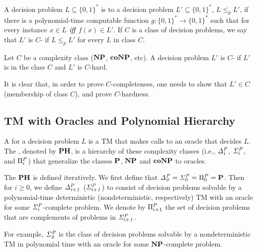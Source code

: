 \begin{definition}
	A decision problem $L \subseteq \{0,1\}^*$  is  to
	a decision problem $L' \subseteq \{0,1\}^*$, $L \leq_p L'$, if there is a
	polynomial-time computable function $g : \{0,1\}^* \rightarrow \{0,1\}^*$
	such that for every instance $x \in L$ $\textit{iff}$ $f(x) \in L'$.
	If $C$ is a class of decision problems, we say that 
	$L'$ is $C$- if $L \leq_p L'$ for 
	every $L$ in class $C$.
\end{definition}


\begin{definition}
	Let $C$ be a complexity class ($\textbf{NP}$, $\textbf{coNP}$, etc).
	A decision problem $L'$ is $C$- if $L'$ is in the class 
	$C$ and $L'$ is $C$-hard.
\end{definition}
It is clear that, in order to prove $C$-completeness, one needs to show
that $L' \in C$ (membership of class $C$), and prove $C$-hardness.



\subsection{TM with Oracles and Polynomial Hierarchy}
A  for a decision problem $L$ is a TM that makes calls 
to an oracle that decides $L$.
The , denoted by $\textbf{PH}$, is a hierarchy of these
complexity classes (i.e., $\mathit{\Delta^P_{i}}$, $\mathit{\Sigma^P_{i}}$, and $\Pi^P_{i}$)
that generalize the classes $\textbf{P}$, $\textbf{NP}$ and $\textbf{coNP}$ to oracles.

\begin{definition}
	The $\textbf{PH}$ is defined iteratively.
	We first define that $\mathit{\Delta^P_{0}} = \mathit{\Sigma^P_{0}} = \Pi^P_{0} = \textbf{P}$.
	Then for $i \geq 0$, we define $\mathit{\Delta^P_{i+1}}$ ($\mathit{\Sigma^P_{i+1}}$) 
	to consist of decision problems solvable
	by a polynomial-time deterministic (nondeterministic, respectively) TM 
	with an oracle for some $\mathit{\Sigma^P_{i}}$-complete problem.
	We denote by $\Pi^P_{i+1}$ the set of decision problems that are complements
	of problems in $\mathit{\Sigma^P_{i+1}}$.
\end{definition}
For example, $\mathit{\Sigma^P_{2}}$ is the class of decision problems solvable by a nondeterministic
TM in polynomial time with an oracle for some $\textbf{NP}$-complete problem.


